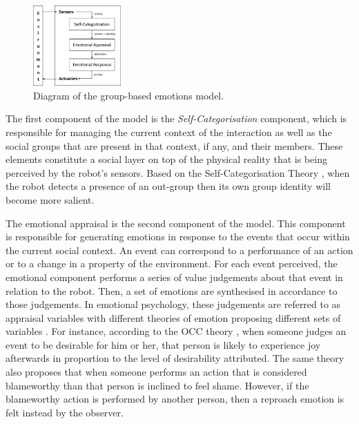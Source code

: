 \begin{figure}[ht]
\centering
\includegraphics[width=0.3\textwidth]{images/gbe/model.png}
\caption{Diagram of the group-based emotions model.}
\label{fig:model}
\end{figure}


The first component of the model is the \textit{Self-Categorisation} component, which is responsible for managing the current context of the interaction as well as the social groups that are present in that context, if any, and their members. These elements constitute a social layer on top of the physical reality that is being perceived by the robot's sensors. Based on the Self-Categorisation Theory \cite{hornsey2008social,turner1987rediscovering}, when the robot detects a presence of an out-group then its own group identity will become more salient. 

The emotional appraisal is the second component of the model. This component is responsible for generating emotions in response to the events that occur within the current social context. An event can correspond to a performance of an action or to a change in a property of the environment. For each event perceived, the emotional component performs a series of value judgements about that event in relation to the robot. Then, a set of emotions are synthesised in accordance to those judgements. In emotional psychology, these judgements are referred to as appraisal variables with different theories of emotion proposing different sets of variables \cite{moors2013appraisal}. For instance, according to the OCC theory \cite{ortony1990cognitive}, when someone judges an event to be desirable for him or her, that person is likely to experience joy afterwards in proportion to the level of desirability attributed. The same theory also proposes that when someone performs an action that is considered blameworthy than that person is inclined to feel shame. However, if the blameworthy action is performed by another person, then a reproach emotion is felt instead by the observer.

